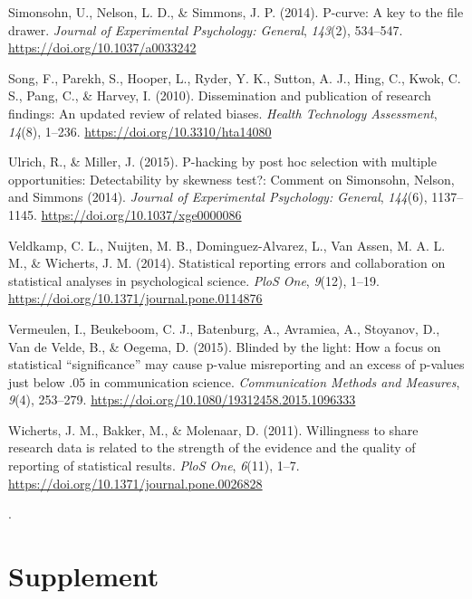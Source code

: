 \documentclass[
  12pt,
]{article}
\newcommand{\beginsupplement}{\setcounter{table}{0}
\renewcommand{\thetable}{S\arabic{table}}
\setcounter{figure}{0} \renewcommand{\thefigure}{S\arabic{figure}}}
\begin{document}
\leavevmode\hypertarget{ref-Simonsohn}{}%
Simonsohn, U., Nelson, L. D., \& Simmons, J. P. (2014). P-curve: A key
to the file drawer. \emph{Journal of Experimental Psychology: General},
\emph{143}(2), 534--547. \url{https://doi.org/10.1037/a0033242}

\leavevmode\hypertarget{ref-Song}{}%
Song, F., Parekh, S., Hooper, L., Ryder, Y. K., Sutton, A. J., Hing, C.,
Kwok, C. S., Pang, C., \& Harvey, I. (2010). Dissemination and
publication of research findings: An updated review of related biases.
\emph{Health Technology Assessment}, \emph{14}(8), 1--236.
\url{https://doi.org/10.3310/hta14080}

\leavevmode\hypertarget{ref-Ulrich}{}%
Ulrich, R., \& Miller, J. (2015). P-hacking by post hoc selection with
multiple opportunities: Detectability by skewness test?: Comment on
Simonsohn, Nelson, and Simmons (2014). \emph{Journal of Experimental
Psychology: General}, \emph{144}(6), 1137--1145.
\url{https://doi.org/10.1037/xge0000086}

\leavevmode\hypertarget{ref-Veldkamp}{}%
Veldkamp, C. L., Nuijten, M. B., Dominguez-Alvarez, L., Van Assen, M. A.
L. M., \& Wicherts, J. M. (2014). Statistical reporting errors and
collaboration on statistical analyses in psychological science.
\emph{PloS One}, \emph{9}(12), 1--19.
\url{https://doi.org/10.1371/journal.pone.0114876}

\leavevmode\hypertarget{ref-Vermeulen}{}%
Vermeulen, I., Beukeboom, C. J., Batenburg, A., Avramiea, A., Stoyanov,
D., Van de Velde, B., \& Oegema, D. (2015). Blinded by the light: How a
focus on statistical ``significance'' may cause p-value misreporting and
an excess of p-values just below .05 in communication science.
\emph{Communication Methods and Measures}, \emph{9}(4), 253--279.
\url{https://doi.org/10.1080/19312458.2015.1096333}

\leavevmode\hypertarget{ref-Wicherts}{}%
Wicherts, J. M., Bakker, M., \& Molenaar, D. (2011). Willingness to
share research data is related to the strength of the evidence and the
quality of reporting of statistical results. \emph{PloS One},
\emph{6}(11), 1--7. \url{https://doi.org/10.1371/journal.pone.0026828}

.

\endgroup

\newpage

\beginsupplement

\hypertarget{supplement}{%
\section{Supplement}\label{supplement}}
\end{document}
